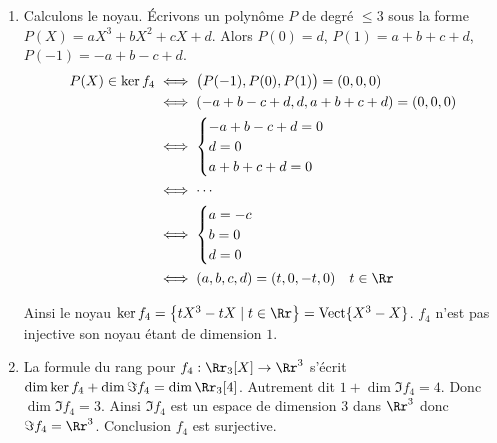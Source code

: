 {{\begin{enumerate}
\begin{enumerate}
  \item Calculons le noyau. \'Ecrivons un polynôme $P$ de degré $\le 3$ sous la forme
$P(X)= aX^3+bX^2+cX+d$. Alors $P(0) = d$, $P(1)=a+b+c+d$, $P(-1)=-a+b-c+d$.
\begin{align*}
P(X) \in \ker f_4 
  & \iff \big( P(-1), P(0), P(1) \big)= (0,0,0)  \\
  & \iff (-a+b-c+d,d,a+b+c+d) = (0,0,0) \\
  &\iff \begin{cases}
          -a+b-c+d = 0 \\
          d = 0 \\   
          a+b+c+d = 0 \\ 
        \end{cases}\\
 & \iff \cdots \\
 & \iff \begin{cases}
          a = -c \\
          b = 0 \\  
          d = 0 \\ 
        \end{cases} \\
  & \iff (a,b,c,d)=(t,0,-t,0) \quad t\in\Rr \\
  \end{align*}

Ainsi le noyau $\ker f_4 = \big\{ tX^3 - tX \mid t\in \Rr\big\} = \text{Vect}\{ X^3-X \}$.
$f_4$ n'est pas injective son noyau étant de dimension $1$.

  \item La formule du rang pour $f_4 : \Rr_3[X] \to \Rr^3$ s'écrit 
$\dim \ker f_4 + \dim \Im f_4 = \dim \Rr_3[4]$. Autrement dit
$1+ \dim \Im f_4 = 4$. Donc $\dim \Im f_4 = 3$. 
Ainsi $\Im f_4$ est un espace de dimension $3$ dans $\Rr^3$ donc 
$\Im f_4=\Rr^3$. Conclusion $f_4$ est surjective.
  \end{enumerate}

\end{enumerate}}
}